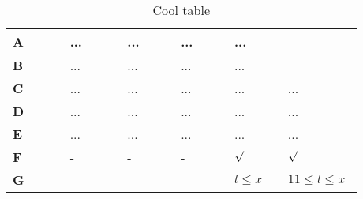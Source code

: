 \lipsum[3]
\begin{table}[H]
	\begin{center}
		\def\arraystretch{2}
		\begin{tabular}{p{0.155\linewidth}|p{0.15\linewidth}|p{0.145\linewidth}|p{0.14\linewidth}|p{0.14\linewidth}|p{0.15\linewidth}}
			\textbf{A}& ...	&...	&... &...  \\
			\hline \textbf{B} &...&...&... &... \\
			\hline \textbf{C} & ... &... &... &... &... \\
			\hline \textbf{D} & ... &...&... &... &... \\
			\hline \textbf{E} & ... &... &... &... &... \\
			\hline \textbf{F} & - &- &- &$\surd$  &$\surd$  \\
			\hline \textbf{G} & - & -& - & $l \leq x$ & $11 \leq l \leq x$\\
		\end{tabular}
	\end{center}
	\caption{Cool table}
	\label{tab:cool_table}
\end{table}